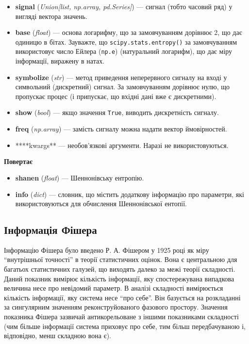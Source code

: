 \documentclass[
  letterpaper,
]{report}
\providecommand{\tightlist}{%
  \setlength{\itemsep}{0pt}\setlength{\parskip}{0pt}}\usepackage{longtable,booktabs,array}
\begin{document}
\begin{itemize}
\tightlist
\item
  \textbf{signal} (\emph{Union{[}list, np.array, pd.Series{]}}) ---
  сигнал (тобто часовий ряд) у вигляді вектора значень.
\item
  \textbf{base} (\emph{float}) --- основа логарифму, що за замовчуванням
  дорівнює 2, що дає одиницю в бітах. Зауважте, що
  \texttt{scipy.stats.entropy()} за замовчуванням використовує число
  Ейлера (\texttt{np.e}) (натуральний логарифм), що дає міру інформації,
  виражену в натах.
\item
  \textbf{symbolize} (\emph{str}) --- метод приведення неперервного
  сигналу на вході у символьний (дискретний) сигнал. За замовчуванням
  дорівнює нулю, що пропускає процес (і припускає, що вхідні дані вже є
  дискретними).
\item
  \textbf{show} (\emph{bool}) --- якщо значення \texttt{True}, виводить
  дискретність сигналу.
\item
  \textbf{freq} (\emph{np.array}) --- замість сигналу можна надати
  вектор ймовірностей.
\item
  ****kwargs** --- необов'язкові аргументи. Наразі не використовуються.
\end{itemize}

\textbf{Повертає}

\begin{itemize}
\tightlist
\item
  \textbf{shanen} (\emph{float}) --- Шеннонівську ентропію.
\item
  \textbf{info} (\emph{dict}) --- словник, що містить додаткову
  інформацію про параметри, які використовуються для обчислення
  Шеннонівської ентопії.
\end{itemize}

\hypertarget{ux456ux43dux444ux43eux440ux43cux430ux446ux456ux44f-ux444ux456ux448ux435ux440ux430}{%
\subsection{Інформація
Фішера}\label{ux456ux43dux444ux43eux440ux43cux430ux446ux456ux44f-ux444ux456ux448ux435ux440ux430}}

Інформацію Фішера було введено Р. А. Фішером у 1925 році як міру
``внутрішньої точності'' в теорії статистичних оцінок. Вона є
центральною для багатьох статистичних галузей, що виходять далеко за
межі теорії складності. Даний показник вимірює кількість інформації, яку
спостережувана випадкова величина несе про невідомий параметр. В аналізі
складності вимірюється кількість інформації, яку система несе ``про
себе''. Він базується на розкладанні за сингулярним значенням
реконструйованого фазового простору. Значення показника Фішера зазвичай
антикорельоване з іншими показниками складності (чим більше інформації
система приховує про себе, тим більш передбачуваною і, відповідно, менш
складною вона є).
\end{document}
